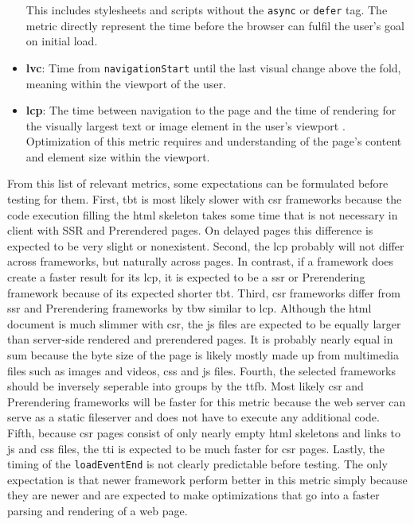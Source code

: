 \documentclass[a4paper, 10pt]{article}
\begin{document}
\begin{itemize}
  This includes stylesheets and scripts without the \verb|async| or \verb|defer| tag.
  The metric directly represent the time before the browser can fulfil the user's goal on initial load.
  \item \textbf{\acrfull{lvc}}: Time from \verb|navigationStart| until the last visual change above the fold, meaning within the viewport of the user. %
  \item \textbf{\acrfull{lcp}}: The time between navigation to the page and the time of rendering for the visually largest text or image element in the user's viewport \citep{lcpDocumentation}.
  Optimization of this metric requires and understanding of the page's content and element size within the viewport.
\end{itemize}

From this list of relevant metrics, some expectations can be formulated before testing for them.
First, \acrshort{tbt} is most likely slower with \acrshort{csr} frameworks because the code execution filling the \acrshort{html} skeleton takes some time that is not necessary in client with SSR and Prerendered pages.
On delayed pages this difference is expected to be very slight or nonexistent.
Second, the \acrshort{lcp} probably will not differ across frameworks, but naturally across pages.
In contrast, if a framework does create a faster result for its \acrshort{lcp}, it is expected to be a \acrshort{ssr} or Prerendering framework because of its expected shorter \acrshort{tbt}.
Third, \acrshort{csr} frameworks differ from \acrshort{ssr} and Prerendering frameworks by \acrlong{tbw} similar to \acrlong{lcp}.
Although the \acrshort{html} document is much slimmer with \acrshort{csr}, the \acrshort{js} files are expected to be equally larger than server-side rendered and prerendered pages.
It is probably nearly equal in sum because the byte size of the page is likely mostly made up from multimedia files such as images and videos, \acrshort{css} and \acrlong{js} files. 
Fourth, the selected frameworks should be inversely seperable into groups by the \acrlong{ttfb}.
Most likely \acrshort{csr} and Prerendering frameworks will be faster for this metric because the web server can serve as a static fileserver and does not have to execute any additional code.
Fifth, because \acrshort{csr} pages consist of only nearly empty \acrshort{html} skeletons and links to \acrshort{js} and \acrshort{css} files, the \acrshort{tti} is expected to be much faster for \acrshort{csr} pages.
Lastly, the timing of the \verb|loadEventEnd| is not clearly predictable before testing.
The only expectation is that newer framework perform better in this metric simply because they are newer and are expected to make optimizations that go into a faster parsing and rendering of a web page.
\end{document}
